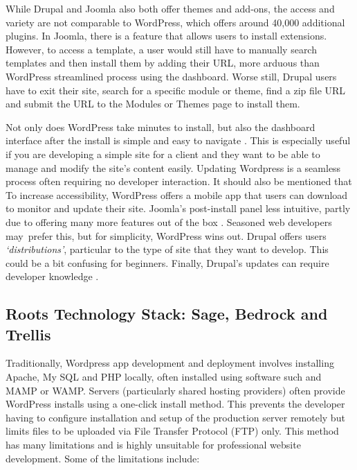 \documentclass[fontsize=11pt]{extarticle}
\numberwithin{figure}{section} %
\begin{document}
While Drupal and Joomla also both offer themes and add-ons, the access
and variety are not comparable to WordPress, which offers around 40,000
additional plugins. In Joomla, there is a feature that allows users to
install extensions. However, to access a template, a user would still
have to manually search templates and then install them by adding their
URL, more arduous than WordPress streamlined process using the
dashboard. Worse still, Drupal users have to exit their site, search for
a specific module or theme, find a zip file URL and submit the URL to
the Modules or Themes page to install them.~

Not only does WordPress take minutes to install, but also the dashboard
interface after the install is simple and easy to navigate \cite{p3}.
This is especially useful if you are developing a simple site for a
client and they want to be able to manage and modify the site's content
easily. Updating Wordpress is a seamless process often requiring no
developer interaction. It should also be mentioned that To increase
accessibility, WordPress offers a mobile app that users can download to
monitor and update their site. Joomla's post-install panel less
intuitive, partly due to offering many more features out of the box
\cite{p2}. Seasoned web developers may~prefer this, but for simplicity,
WordPress wins out. Drupal offers users \emph{`distributions'},
particular to the type of site that they want to develop. This could be
a bit confusing for beginners. Finally, Drupal's updates can require
developer knowledge \cite{p4}.

\hypertarget{roots-technology-stack-sage-bedrock-and-trellis}{%
\subsection{Roots Technology Stack: Sage, Bedrock and
Trellis}\label{roots-technology-stack-sage-bedrock-and-trellis}}

Traditionally, Wordpress app development and deployment involves
installing Apache, My SQL and PHP locally, often installed using
software such and MAMP or WAMP. Servers (particularly shared hosting
providers) often provide WordPress installs using a one-click install
method. This prevents the developer having to configure installation and
setup of the production server remotely but limits files to be uploaded
via File Transfer Protocol (FTP) only. This method has many limitations
and is highly unsuitable for professional website development. Some of
the limitations include:
\end{document}
